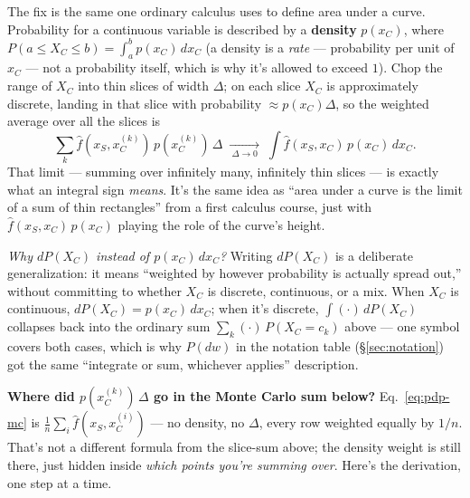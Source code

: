 The fix is the same one ordinary calculus uses to define area under a
curve. Probability for a continuous variable is described by a
\textbf{density} $p(x_C)$, where $P(a\le X_C\le b)=\int_a^b p(x_C)\,dx_C$
(a density is a \emph{rate} --- probability per unit of $x_C$ --- not a
probability itself, which is why it's allowed to exceed $1$). Chop the
range of $X_C$ into thin slices of width $\Delta$; on each slice $X_C$ is
approximately discrete, landing in that slice with probability
$\approx p(x_C)\Delta$, so the weighted average over all the slices is
$$\sum_k \hat f(x_S,x_C^{(k)})\, p(x_C^{(k)})\, \Delta
\;\xrightarrow[\ \Delta\to 0\ ]{}\;
\int \hat f(x_S,x_C)\, p(x_C)\, dx_C.$$
That limit --- summing over infinitely many, infinitely thin slices --- is
exactly what an integral sign \emph{means}. It's the same idea as ``area
under a curve is the limit of a sum of thin rectangles'' from a first
calculus course, just with $\hat f(x_S,x_C)\,p(x_C)$ playing the role of
the curve's height.

\emph{Why $dP(X_C)$ instead of $p(x_C)\,dx_C$?} Writing $dP(X_C)$ is a
deliberate generalization: it means ``weighted by however probability is
actually spread out,'' without committing to whether $X_C$ is discrete,
continuous, or a mix. When $X_C$ is continuous, $dP(X_C) = p(x_C)\,dx_C$;
when it's discrete, $\int(\cdot)\,dP(X_C)$ collapses back into the ordinary
sum $\sum_k(\cdot)\,P(X_C{=}c_k)$ above --- one symbol covers both cases,
which is why $P(dw)$ in the notation table (\S\ref{sec:notation}) got the
same ``integrate or sum, whichever applies'' description.

\textbf{Where did $p(x_C^{(k)})\,\Delta$ go in the Monte Carlo sum below?}
Eq.~\eqref{eq:pdp-mc} is $\frac1n\sum_i \hat f(x_S,x_C^{(i)})$ --- no density,
no $\Delta$, every row weighted equally by $1/n$. That's not a different
formula from the slice-sum above; the density weight is still there, just
hidden inside \emph{which points you're summing over}. Here's the
derivation, one step at a time.

